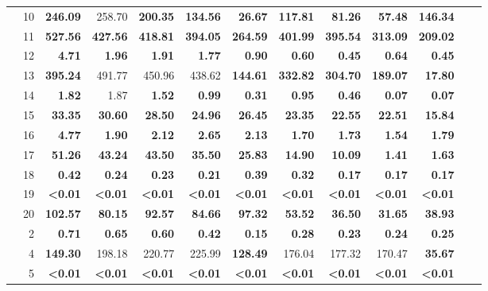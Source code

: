 \begin{table}
{\begin{tabular}{crrrrrrrrrrrr}
& 10 & \textbf{246.09} & 258.70 & \textbf{200.35} & \textbf{134.56} & \textbf{26.67} & \textbf{117.81} & \textbf{81.26} & \textbf{57.48} & \textbf{146.34}  \\
& 11 & \textbf{527.56} & \textbf{427.56} & \textbf{418.81} & \textbf{394.05} & \textbf{264.59} & \textbf{401.99} & \textbf{395.54} & \textbf{313.09} & \textbf{209.02} \\
& 12 & \textbf{4.71} & \textbf{1.96} & \textbf{1.91} & \textbf{1.77} & \textbf{0.90} & \textbf{0.60} & \textbf{0.45} & \textbf{0.64} & \textbf{0.45} \\
& 13 & \textbf{395.24} & 491.77 & 450.96 & 438.62 & \textbf{144.61} & \textbf{332.82} & \textbf{304.70} & \textbf{189.07} & \textbf{17.80} \\
& 14 & \textbf{1.82} & 1.87 & \textbf{1.52} & \textbf{0.99} & \textbf{0.31} & \textbf{0.95} & \textbf{0.46} & \textbf{0.07} & \textbf{0.07} \\
& 15 & \textbf{33.35} & \textbf{30.60} & \textbf{28.50} & \textbf{24.96} & \textbf{26.45} & \textbf{23.35} & \textbf{22.55} & \textbf{22.51} & \textbf{15.84} \\
& 16 & \textbf{4.77} & \textbf{1.90} & \textbf{2.12} & \textbf{2.65} & \textbf{2.13} & \textbf{1.70} & \textbf{1.73} & \textbf{1.54} & \textbf{1.79} \\
& 17 & \textbf{51.26} & \textbf{43.24}  & \textbf{43.50} & \textbf{35.50} & \textbf{25.83} & \textbf{14.90} & \textbf{10.09} & \textbf{1.41} & \textbf{1.63} \\
& 18 & \textbf{0.42} & \textbf{0.24} & \textbf{0.23} & \textbf{0.21} & \textbf{0.39} & \textbf{0.32} & \textbf{0.17} & \textbf{0.17} & \textbf{0.17} \\
& 19 & \textbf{<0.01} & \textbf{<0.01} & \textbf{<0.01} & \textbf{<0.01} & \textbf{<0.01} & \textbf{<0.01} & \textbf{<0.01} & \textbf{<0.01} & \textbf{<0.01}\\
& 20 & \textbf{102.57} & \textbf{80.15} & \textbf{92.57} & \textbf{84.66} & \textbf{97.32} & \textbf{53.52} & \textbf{36.50} & \textbf{31.65} & \textbf{38.93} \\
\noalign{\medskip}
\parbox[t]{2mm}{} &
2 & \textbf{0.71} & \textbf{0.65} & \textbf{0.60} & \textbf{0.42} & \textbf{0.15} & \textbf{0.28} & \textbf{0.23} & \textbf{0.24} & \textbf{0.25} & \\
& 4 & \textbf{149.30} & 198.18 & 220.77 & 225.99 & \textbf{128.49} & 176.04 & 177.32 & 170.47 & \textbf{35.67} \\
& 5 & \textbf{<0.01} & \textbf{<0.01} & \textbf{<0.01} & \textbf{<0.01} & \textbf{<0.01} & \textbf{<0.01} & \textbf{<0.01} & \textbf{<0.01} & \textbf{<0.01} \\

\end{tabular}}
\end{table}
